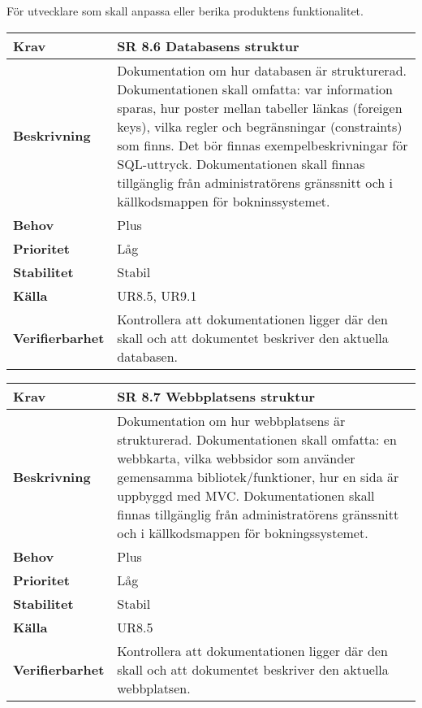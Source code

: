 \documentclass[a4paper, twoside, 11pt, titlepage]{article}
\begin{document}
	För utvecklare som skall anpassa eller berika produktens funktionalitet.

	\begin{tabular} { p{2.6cm} p{12.5cm} }
		\hline
		\sffamily\textbf{Krav} & \sffamily\textbf{SR 8.6 Databasens struktur } \\
		\hline
		\sffamily\textbf{Beskrivning} & Dokumentation om hur databasen är strukturerad. Dokumentationen skall omfatta: var information sparas, hur poster mellan tabeller länkas (foreigen keys), vilka regler och begränsningar (constraints) som finns. Det bör finnas exempelbeskrivningar för SQL-uttryck. Dokumentationen skall finnas tillgänglig från administratörens gränssnitt och i källkodsmappen för bokninssystemet.  \\
		\hline
		\sffamily\textbf{Behov} & Plus  \\
		\hline
		\sffamily\textbf{Prioritet} & Låg  \\
		\hline
		\sffamily\textbf{Stabilitet} & Stabil  \\
		\hline
		\sffamily\textbf{Källa} & UR8.5, UR9.1  \\
		\hline
		\sffamily\textbf{Verifierbarhet} & Kontrollera att dokumentationen ligger där den skall och att dokumentet beskriver den aktuella databasen.  \\
		\hline
	\end{tabular}
	\vspace{6mm}

	\begin{tabular} { p{2.6cm} p{12.5cm} }
		\hline
		\sffamily\textbf{Krav} & \sffamily\textbf{SR 8.7 Webbplatsens struktur } \\
		\hline
		\sffamily\textbf{Beskrivning} & Dokumentation om hur webbplatsens är strukturerad. Dokumentationen skall omfatta: en webbkarta, vilka webbsidor som använder gemensamma bibliotek/funktioner, hur en sida är uppbyggd med MVC. Dokumentationen skall finnas tillgänglig från administratörens gränssnitt och i  källkodsmappen för bokningssystemet.  \\
		\hline
		\sffamily\textbf{Behov} & Plus  \\
		\hline
		\sffamily\textbf{Prioritet} & Låg  \\
		\hline
		\sffamily\textbf{Stabilitet} & Stabil  \\
		\hline
		\sffamily\textbf{Källa} & UR8.5  \\
		\hline
		\sffamily\textbf{Verifierbarhet} & Kontrollera att dokumentationen ligger där den skall och att dokumentet beskriver den aktuella webbplatsen.  \\
		\hline
	\end{tabular}
	\vspace{6mm}
\end{document}
